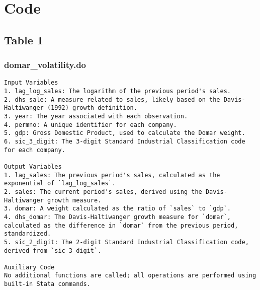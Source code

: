 \documentclass[11pt]{article}
\theoremstyle{definition}
\newcommand{\codepath}{F:/12004835/replication_package_final/replication_package_final}
\begin{document}
	\clearpage
	\newpage
	\section{Code}
	\subsection{Table 1}
	\subsubsection{domar\_volatility.do}
	\begin{lstlisting}[style=Matlab]
Input Variables
1. lag_log_sales: The logarithm of the previous period's sales.
2. dhs_sale: A measure related to sales, likely based on the Davis-Haltiwanger (1992) growth definition.
3. year: The year associated with each observation.
4. permno: A unique identifier for each company.
5. gdp: Gross Domestic Product, used to calculate the Domar weight.
6. sic_3_digit: The 3-digit Standard Industrial Classification code for each company.

Output Variables
1. lag_sales: The previous period's sales, calculated as the exponential of `lag_log_sales`.
2. sales: The current period's sales, derived using the Davis-Haltiwanger growth measure.
3. domar: A weight calculated as the ratio of `sales` to `gdp`.
4. dhs_domar: The Davis-Haltiwanger growth measure for `domar`, calculated as the difference in `domar` from the previous period, standardized.
5. sic_2_digit: The 2-digit Standard Industrial Classification code, derived from `sic_3_digit`.

Auxiliary Code
No additional functions are called; all operations are performed using built-in Stata commands.
	\end{lstlisting}
	
	
\end{document}
